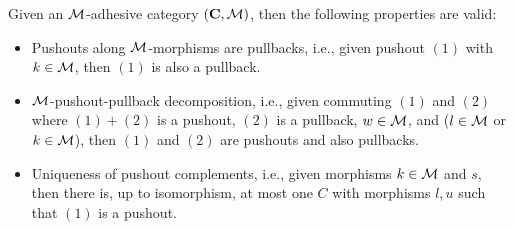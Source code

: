 \begin{definition}
\label{def:sec-gt-M-adh:hlr_props}
Given an ${\cal M}$-adhesive category $(\mathbf{C},{\cal M})$, then the following properties are valid:
\begin{itemize}
  \item Pushouts along ${\cal M}$-morphisms are pullbacks, i.e., given pushout $(1)$ with $k \in {\cal M}$, then $(1)$ is also a pullback.
  \item {}${\cal M}$-pushout-pullback decomposition, i.e., given commuting $(1)$ and $(2)$ where $(1)+(2)$ is a pushout, $(2)$ is a pullback, $w \in {\cal M}$, and ($l \in {\cal M}$ or $k \in {\cal M}$), then $(1)$ and $(2)$ are pushouts and also pullbacks.
  \item {}Uniqueness of pushout complements, i.e., given morphisms $k \in {\cal M}$ and $s$, then there is, up to isomorphism, at most one $C$ with morphisms $l,u$ such that $(1)$ is a pushout.
  \envEndMarker
\end{itemize}
\end{definition}

